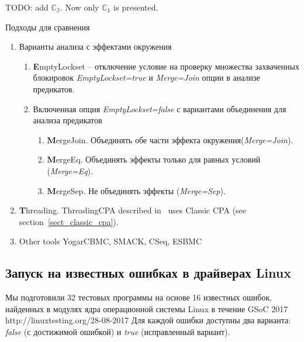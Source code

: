TODO: add $\mathbb{C_2}$.
Now only $\mathbb{C_1}$ is presented.

Подходы для сравнения
\begin{enumerate}
\item Варианты анализа с эффектами окружения
\begin{enumerate}
\item {\textbf EmptyLockset} -- отключение условие на проверку множества захваченных блокировок {\em EmptyLockset=true} и {\em Merge=Join} опции в анализе предикатов.
\item Включенная опция {\em EmptyLockset=false} с вариантами объединения для анализа предикатов
\begin{enumerate}
\item {\textbf MergeJoin}. Объединять обе части эффекта окружения({\em Merge=Join}). 
\item {\textbf MergeEq}. Объединять эффекты только для равных условий ({\em Merge=Eq}).
\item {\textbf MergeSep}. Не объединять эффекты ({\em Merge=Sep}). 
\end{enumerate}
\end{enumerate}
\item {\textbf Threading}. ThreadingCPA
described in~\cite{MEMICS16-Multi-Threaded} uses Classic CPA (see section~\ref{sect_classic_cpa}).
\item Other tools YogarCBMC, SMACK, CSeq, ESBMC
\end{enumerate}

\subsection{Запуск на известных ошибках в драйверах Linux}
Мы подготовили 32 тестовых программы на основе 16 известных ошибок, найденных в модулях ядра операционной системы Linux в течение GSoC 2017 http://linuxtesting.org/28-08-2017
Для каждой ошибки доступны два варианта: {\em false} (с достижимой ошибкой) и {\em true} (исправленный вариант).

